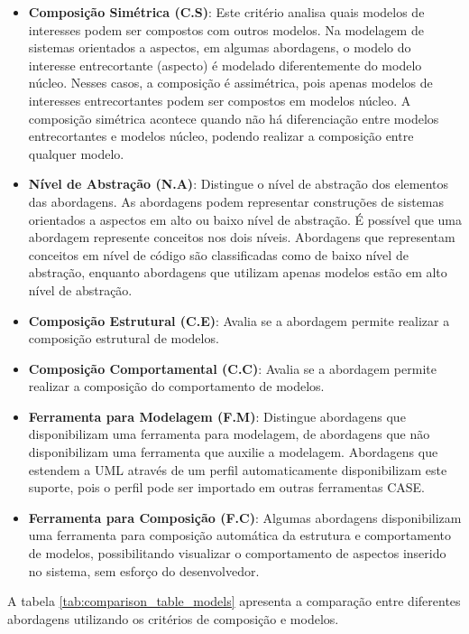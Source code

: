 \begin{itemize}
	\item \textbf{Composição Simétrica (C.S)}: Este critério analisa quais modelos de interesses podem ser compostos com outros modelos. Na modelagem de
	sistemas orientados a aspectos, em algumas abordagens, o modelo do interesse entrecortante (aspecto) é modelado diferentemente do modelo núcleo.
	Nesses casos, a composição é assimétrica, pois apenas modelos de interesses entrecortantes podem ser compostos em modelos núcleo. A composição
	simétrica acontece quando não há diferenciação entre modelos entrecortantes e modelos núcleo, podendo realizar a composição entre qualquer modelo.
	\item \textbf{Nível de Abstração (N.A)}: Distingue o nível de abstração dos elementos das abordagens. As abordagens podem representar construções de
	sistemas orientados a aspectos em alto ou baixo nível de abstração. É possível que uma abordagem represente conceitos nos dois níveis. Abordagens que
	representam conceitos em nível de código são classificadas como de baixo nível de abstração, enquanto abordagens que utilizam apenas modelos estão em
	alto nível de abstração.
	\item \textbf{Composição Estrutural (C.E)}: Avalia se a abordagem permite realizar a composição estrutural de modelos.
	\item \textbf{Composição Comportamental (C.C)}: Avalia se a abordagem permite realizar a composição do comportamento de modelos.
	\item \textbf{Ferramenta para Modelagem (F.M)}: Distingue abordagens que disponibilizam uma ferramenta para modelagem, de abordagens que não
	disponibilizam uma ferramenta que auxilie a modelagem. Abordagens que estendem a UML através de um perfil automaticamente disponibilizam este suporte, pois o perfil
	pode ser importado em outras ferramentas CASE.
	\item \textbf{Ferramenta para Composição (F.C)}: Algumas abordagens disponibilizam uma ferramenta para composição automática da estrutura e
	comportamento de modelos, possibilitando visualizar o comportamento de aspectos inserido no sistema, sem esforço do desenvolvedor. 
\end{itemize}

A tabela \ref{tab:comparison_table_models} apresenta a comparação entre diferentes abordagens utilizando os critérios de composição e modelos.

